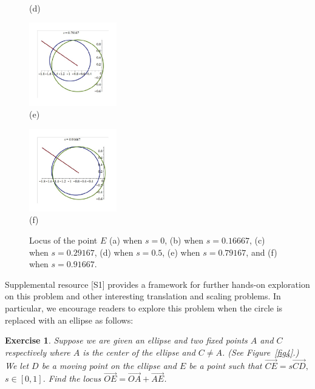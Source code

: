 \documentclass[12pt,a4paper]{article}%
\newtheorem{exercise}[theorem]{Exercise}
\begin{document}
\begin{figure}
\begin{center}
{\begin{center}
\\
(d)
\end{center}}
\qquad
\parbox[b]{1.5in}{\begin{center}
\includegraphics[width=1.5in,trim=0mm 0mm 0mm 15mm,clip,keepaspectratio]{PJH75H16.pdf}
\\
(e)
\end{center}}
\qquad
\parbox[b]{1.5in}{\begin{center}
\includegraphics[width=1.5in,trim=0mm 0mm 0mm 15mm,clip,keepaspectratio]{PJH75H17.pdf}
\\
(f)
\end{center}}
\end{center}
\caption{Locus of the point $E$
               (a) when $s=0$, (b) when $s=0.16667$, (c) when  $s=0.29167$,
               (d) when $s=0.5$, (e) when $s=0.79167$, and (f) when $s=0.91667$.}
\label{fig3}
\end{figure}

Supplemental resource [S1] provides a framework for further hands-on
exploration on this problem and other interesting translation and scaling
problems. In particular, we encourage readers to explore this problem
when the circle is replaced with an ellipse as follows:

\begin{exercise} \label{ex2}
Suppose we are given an ellipse and two fixed points $A$ and $C$ respectively
where $A$ is the center of the ellipse and $C\neq A$. (See Figure~\ref{fig4}.)
 We let $D$ be a moving point on the ellipse and $E$ be a point such that
$\overrightarrow{CE}=s\overrightarrow{CD},$ $s\in[0,1]$.
Find the locus $\overrightarrow{OE}=\overrightarrow{OA}+\overrightarrow{AE}$.
\end{exercise}
\end{document}
